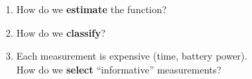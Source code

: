 \documentclass[10pt,mathserif]{beamer}
\begin{document}
\begin{frame}
\begin{enumerate}
\item<1-> How do we \textbf{estimate} the function?
\vspace{1em}
\item<2-> How do we \textbf{classify}?
\vspace{1em}
\item<3-> Each measurement is expensive (time, battery power).\\
      How do we \textbf{select} ``informative'' measurements?
\end{enumerate}
\vspace{2em}
\begin{center}
\end{center}
\end{frame}

\end{document}
